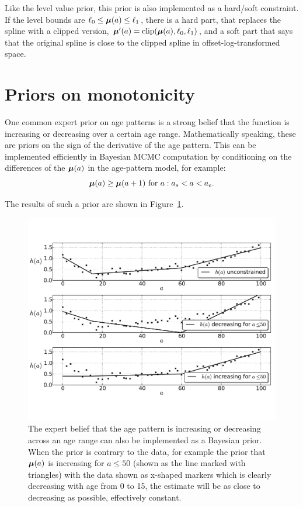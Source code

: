Like the level value prior, this prior is also implemented as a
hard/soft constraint.  If the level bounds are $\ell_0 \leq \boldsymbol{\mu}(a)
\leq \ell_1$, there is a hard part, that replaces the spline with a
clipped version, $\boldsymbol{\mu}'(a) = \operatorname{clip}(\boldsymbol{\mu}(a), \ell_0, \ell_1)$, and a
soft part that says that the original spline is close to the clipped
spline in offset-log-transformed space.

\section{Priors on monotonicity}

One common expert prior on age patterns is a strong belief that the
function is increasing or decreasing over a certain age
range. Mathematically speaking, these are priors on the sign of the
derivative of the age pattern.  This can be implemented efficiently in
Bayesian MCMC computation by conditioning on the differences of the
$\boldsymbol{\mu}(a)$ in the age-pattern model, for example:
\[
\boldsymbol{\mu}(a) \geq \boldsymbol{\mu}(a+1) \text{ for } a : a_s < a < a_e.
\]

The results of such a prior are shown in
Figure~\ref{monotone-age-pattern}.


\begin{figure}[h]
\begin{center}
\includegraphics[width=\textwidth]{monotone-smoothing-splines.pdf}
\caption{The expert belief that the age pattern
is increasing or decreasing across an age range can also be
implemented as a Bayesian prior.  When the prior is contrary to the
data, for example the prior that $\boldsymbol{\mu}(a)$ is increasing for $a \leq
50$ (shown as the line marked with triangles) with the data shown as
x-shaped markers which is clearly decreasing with age from 0 to 15,
the estimate will be as close to decreasing as possible, effectively
constant.}
\label{monotone-age-pattern}
\end{center}
\end{figure}


